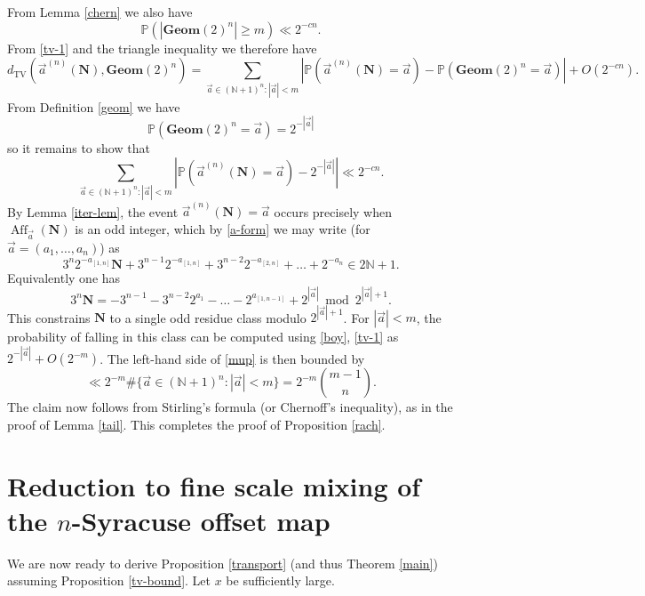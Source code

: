 \documentclass[12pt,a4paper,reqno]{amsart}
\numberwithin{equation}{section}
\theoremstyle{plain}
\theoremstyle{definition}
\renewcommand\P{\mathbb{P}}
\newcommand\N{\mathbb{N}}
\newcommand\Geom{\mathbf{Geom}}
\newcommand\TV{{\operatorname{TV}}}
\newcommand\Aff{{\operatorname{Aff}}}
\renewcommand{\mod}{\bmod}
\begin{document}
From Lemma \ref{chern} we also have
$$ \P( |\Geom(2)^n| \geq m ) \ll 2^{-cn}.$$
From \eqref{tv-1} and the triangle inequality we therefore have
$$ d_\TV(\vec a^{(n)}(\mathbf{N}), \Geom(2)^n) =
\sum_{\vec a \in (\N+1)^n: |\vec a| < m} |\P(\vec a^{(n)}(\mathbf{N})=\vec a) - \P(\Geom(2)^n=\vec a)| + O( 2^{-cn} ).$$
From Definition \ref{geom} we have
$$ \P(\Geom(2)^n=\vec a) = 2^{-|\vec a|} $$
so it remains to show that
\begin{equation}\label{mup}
 \sum_{\vec a \in (\N+1)^n: |\vec a| < m} |\P(\vec a^{(n)}(\mathbf{N})=\vec a) - 2^{-|\vec a|}| \ll 2^{-cn}.
\end{equation}
By Lemma \ref{iter-lem}, the event $\vec a^{(n)}(\mathbf{N})=\vec a$ occurs precisely when $\Aff_{\vec a}(\mathbf{N})$ is an odd integer, which by \eqref{a-form} we may write (for $\vec a = (a_1,\dots,a_n)$) as
$$ 
3^n 2^{-a_{[1,n]}} \mathbf{N} + 3^{n-1} 2^{-a_{[1,n]}} + 3^{n-2} 2^{-a_{[2,n]}} + \dots + 2^{-a_n} \in 2\N+1.$$
Equivalently one has
$$ 3^n \mathbf{N} = - 3^{n-1} - 3^{n-2} 2^{a_1} - \dots - 2^{a_{[1,n-1]}} + 2^{|\vec a|} \mod 2^{|\vec a|+1}.$$
This constrains $\mathbf{N}$ to a single odd residue class modulo $2^{|\vec a|+1}$.  For $|\vec a| < m$, the probability of falling in this class can be computed using \eqref{boy}, \eqref{tv-1} as $2^{-|\vec a|} + O( 2^{-m} )$.  The left-hand side of \eqref{mup} is then bounded by
$$ \ll 2^{-m} \# \{ \vec a \in (\N+1)^n: |\vec a| < m \} = 2^{-m} \binom{m-1}{n}.$$
The claim now follows from Stirling's formula (or Chernoff's inequality), as in the proof of Lemma \ref{tail}.  This completes the proof of Proposition \ref{rach}.

\section{Reduction to fine scale mixing of the $n$-Syracuse offset map}\label{main-sec}

We are now ready to derive Proposition \ref{transport} (and thus Theorem \ref{main}) assuming Proposition \ref{tv-bound}.  Let $x$ be sufficiently large.
\end{document}
